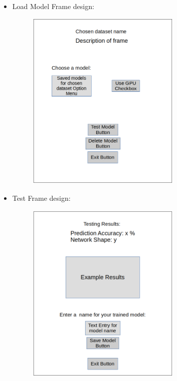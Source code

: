 \documentclass[./project-report/src/latex/project-report.tex]{subfiles}
\begin{document}
\begin{itemize}
    \pagebreak

    \item Load Model Frame design:
        \begin{figure}[h!]
        \centering
        \includegraphics[width=0.7\textwidth]{./project-report/src/images/load-model-frame-design.png}
        \end{figure}
    
    \pagebreak
    
    \item Test Frame design:
        \begin{figure}[h!]
        \centering
        \includegraphics[width=0.7\textwidth]{./project-report/src/images/testing-frame-design.png}
        \end{figure}
\end{itemize}
\end{document}
